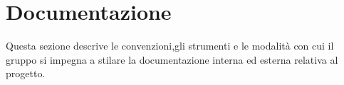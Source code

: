 \section{Documentazione}
Questa sezione descrive le convenzioni,gli strumenti e le modalità con cui il gruppo si impegna a stilare la documentazione interna ed esterna relativa al progetto.





